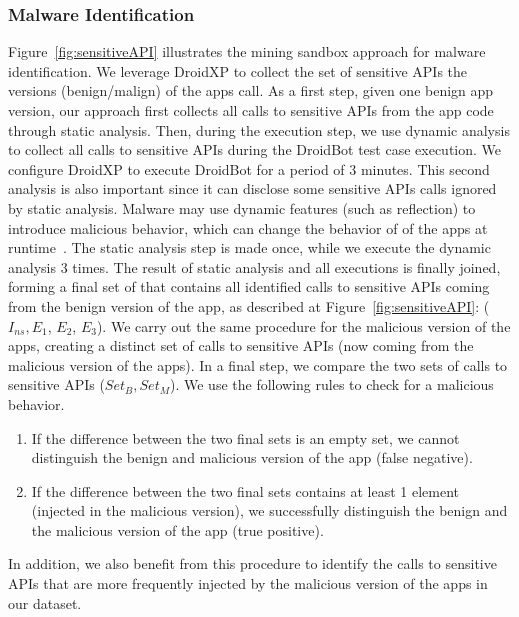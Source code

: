 \subsubsection{Malware Identification} \label{sec:malwaresetup}
Figure~\ref{fig:sensitiveAPI} illustrates the mining sandbox approach for
malware identification. We leverage DroidXP to collect the set of sensitive APIs the versions (benign/malign) of the apps call. As a first step, given one benign app version,
our approach first collects all calls to sensitive APIs from the app code through static analysis. Then, during the execution step,
we use dynamic analysis to collect all calls to sensitive APIs during the DroidBot test case execution. We configure DroidXP to execute DroidBot for a
period of $3$ minutes. This second analysis is also important since it can disclose some sensitive APIs calls ignored by static analysis.
Malware may use dynamic features (such as reflection) to introduce malicious behavior, which can change the behavior of of the apps at runtime~\cite{DBLP:journals/spe/ZhangLTX18,DBLP:journals/tosem/LiTX19}.
The static analysis step is made once, while we execute the dynamic analysis $3$ times. The result of static analysis and all executions is finally joined,
forming a final set of that contains all identified calls to sensitive APIs coming from the benign version of the app, as described at Figure~\ref{fig:sensitiveAPI}: ($I_{ns}, E_1$, $E_2$, $E_3$). We carry out the same procedure for the malicious version of the apps,
creating a distinct set of calls to sensitive APIs (now coming from the malicious version of the apps). In
a final step, we compare the two sets of calls to sensitive APIs ($Set_B, Set_M$). We use the following rules to
check for a malicious behavior. 

\begin{enumerate}
    \item If the difference between the two final sets is an empty set, we cannot distinguish the benign and malicious version of the app (false negative).
    \item If the difference between the two final sets contains at least 1 element (injected in the malicious version), we successfully distinguish the benign and the malicious version of the app (true positive).
\end{enumerate}

In addition, we also benefit from this procedure to identify the calls to sensitive APIs that are more frequently injected by the malicious version of the apps
in our dataset. 

